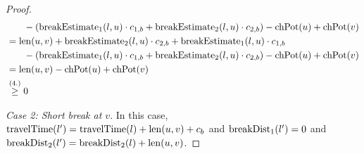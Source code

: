 \begin{proof}
\begin{align}
\begin{split}
			& \phantom{{}=1} - (\breakEstimate_1(l,u) \cdot \restr_{1,b} + \breakEstimate_2(l,u) \cdot \restr_{2,b}) - \chpotential(u) + \chpotential(v)\\
			&= \len(u,v) + \breakEstimate_2(l,u) \cdot \restr_{2,b} + \breakEstimate_1(l,u) \cdot \restr_{1,b} \\
			& \phantom{{}=1} - (\breakEstimate_1(l,u) \cdot \restr_{1,b} + \breakEstimate_2(l,u) \cdot \restr_{2,b}) - \chpotential(u) + \chpotential(v)\\
			&= \len(u,v) - \chpotential(u) + \chpotential(v)\\
			&\stackrel{\text{(4.)}}{\ge} 0
		\end{split}
	\end{align}

	\emph{Case 2: Short break at $v$}. In this case, $\operatorname{travelTime}(l') = \operatorname{travelTime}(l) + \operatorname{len}(u,v) + c_b$ and $\operatorname{breakDist}_1(l') = 0$ and $\operatorname{breakDist}_2(l') = \operatorname{breakDist}_2(l) + \operatorname{len}(u,v)$.


\end{proof}
